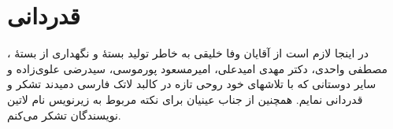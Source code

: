 \documentclass{article}
\theoremstyle{plain}\newtheorem{question}{پرسش}
\begin{document}
\section*{قدردانی}
در اینجا لازم است از آقایان وفا خلیقی به خاطر تولید بستهٔ \XePersian و نگهداری از بستهٔ ، مصطفی واحدی، دکتر مهدی امیدعلی، امیرمسعود پورموسی، سیدرضی علوی‌زاده و سایر دوستانی که با تلاشهای خود روحی تازه در کالبد لاتک فارسی دمیدند تشکر و قدردانی نمایم. همچنین از جناب عینیان برای نکته مربوط به زیرنویس نام لاتین نویسندگان تشکر می‌کنم.


\end{document}
